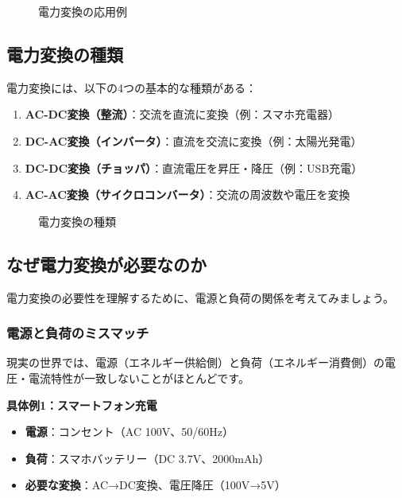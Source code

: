 \begin{figure}[H]
\centering
{}
\caption{電力変換の応用例}
\label{fig:applications}
\end{figure}

\subsection{電力変換の種類}

電力変換には、以下の4つの基本的な種類がある：

\begin{enumerate}
\item \textbf{AC-DC変換（整流）}：交流を直流に変換（例：スマホ充電器）
\item \textbf{DC-AC変換（インバータ）}：直流を交流に変換（例：太陽光発電）
\item \textbf{DC-DC変換（チョッパ）}：直流電圧を昇圧・降圧（例：USB充電）
\item \textbf{AC-AC変換（サイクロコンバータ）}：交流の周波数や電圧を変換
\end{enumerate}

\begin{figure}[H]
\centering
{}
\caption{電力変換の種類}
\label{fig:conversion_types}
\end{figure}

\subsection{なぜ電力変換が必要なのか}

電力変換の必要性を理解するために、電源と負荷の関係を考えてみましょう。

\subsubsection{電源と負荷のミスマッチ}

現実の世界では、電源（エネルギー供給側）と負荷（エネルギー消費側）の電圧・電流特性が一致しないことがほとんどです。

\begin{screen}
\textbf{具体例1：スマートフォン充電}

\begin{itemize}
\item \textbf{電源}：コンセント（AC 100V、50/60Hz）
\item \textbf{負荷}：スマホバッテリー（DC 3.7V、2000mAh）
\item \textbf{必要な変換}：AC→DC変換、電圧降圧（100V→5V）
\end{itemize}
\end{screen}

